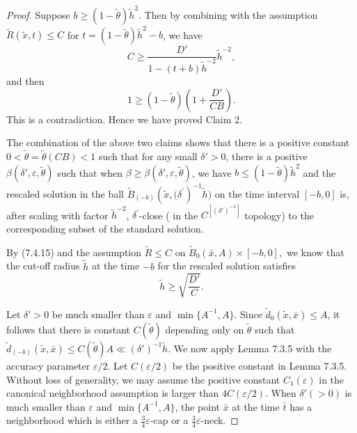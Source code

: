 \begin{proof}
Suppose $b\geq (1-\tilde{\theta})\tilde{h}^{2}$. Then by combining
with the assumption $\widetilde{R}(\tilde{x},t)\leq {C}$ for
$t=(1-\tilde{\theta})\tilde{h}^{2}-b$, we have
$$
C\geq \frac{D'}{1-(t+b)\tilde{h}^{-2}}\tilde{h}^{-2},
$$
and then
$$
1\geq(1-\tilde{\theta})\left(1+\frac{D'}{CB}\right).
$$
This is a contradiction. Hence we have proved Claim 2.

The combination of the above two claims shows that there is a
positive constant $0 <\tilde{\theta}=\tilde{\theta}(CB)<1$ such
that for any small $\delta'>0$, there is a positive
$\beta(\delta',\varepsilon, \tilde{\theta})$ such that when $\beta
\geq \beta(\delta',\varepsilon, \tilde{\theta})$, we have $b\leq
(1-\tilde{\theta})\tilde{h}^{2}$ and the rescaled solution in the
ball
$\widetilde{B}_{(-b)}(\tilde{x},{(\delta^{\prime}})^{-1}\tilde{h})$
on the time interval $[-b,0]$ is, after scaling with factor
$\tilde{h}^{-2}$, ${\delta}^{\prime}$-close ( in the
$C^{[(\delta')^{-1}]}$ topology) to the corresponding subset of
the standard solution.

By (7.4.15) and the assumption $\widetilde{R}\leq {C}$ on
$\widetilde{B}_{0}(\bar{x},A) \times [-b,0],$ we know that the
cut-off radius $\tilde{h}$ at the time $-b$ for the rescaled
solution satisfies
$$\tilde{h} \geq \sqrt{\frac{D'}{C}}.$$

Let $\delta'>0$ be much smaller than $\varepsilon$ and
$\min\{A^{-1},A\}$. Since $\tilde{d}_0(\tilde{x},\bar{x})\leq A$,
it follows that there is constant $C(\tilde{\theta})$ depending
only on $\tilde{\theta}$ such that
$\tilde{d}_{(-b)}(\tilde{x},\bar{x})\leq C(\tilde{\theta})A \ll
(\delta')^{-1}\tilde{h}$. We now apply Lemma 7.3.5 with the
accuracy parameter ${\varepsilon}/{2}$. Let $C({\varepsilon}/{2})$
be the positive constant in Lemma 7.3.5. Without loss of
generality, we may assume the positive constant $C_1(\varepsilon)$
in the canonical neighborhood assumption is larger than
$4C({\varepsilon}/{2})$.  When $\delta'(>0)$ is much smaller than
$\varepsilon$ and $\min\{A^{-1},A\}$, the point $\bar{x}$ at the
time $\bar{t}$ has a neighborhood which is either a
$\frac{3}{4}\varepsilon$-cap or a $\frac{3}{4}\varepsilon$-neck.


\end{proof}
